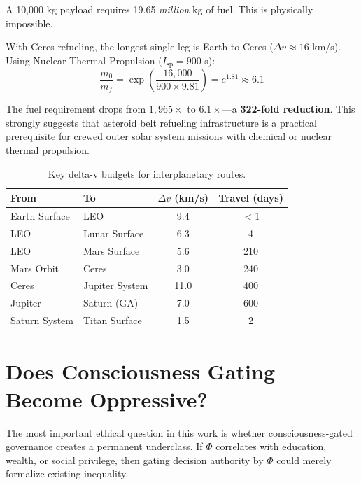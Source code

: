 \documentclass[12pt,a4paper]{article}
\begin{document}
A 10,000 kg payload requires 19.65 \emph{million} kg of fuel. This is physically impossible.

With Ceres refueling, the longest single leg is Earth-to-Ceres ($\Delta v \approx 16$ km/s). Using Nuclear Thermal Propulsion ($I_\text{sp} = 900$ s):
\begin{equation}
    \frac{m_0}{m_f} = \exp\left(\frac{16{,}000}{900 \times 9.81}\right) = e^{1.81} \approx 6.1
\end{equation}

The fuel requirement drops from $1{,}965\times$ to $6.1\times$---a \textbf{322-fold reduction}. This strongly suggests that asteroid belt refueling infrastructure is a practical prerequisite for crewed outer solar system missions with chemical or nuclear thermal propulsion.

\begin{table}[h]
\centering
\caption{Key delta-v budgets for interplanetary routes.}
\label{tab:deltav}
\begin{tabular}{@{}llcc@{}}
\toprule
\textbf{From} & \textbf{To} & \textbf{$\Delta v$ (km/s)} & \textbf{Travel (days)} \\
\midrule
Earth Surface & LEO              & 9.4  & $<$1 \\
LEO           & Lunar Surface    & 6.3  & 4 \\
LEO           & Mars Surface     & 5.6  & 210 \\
Mars Orbit    & Ceres            & 3.0  & 240 \\
Ceres         & Jupiter System   & 11.0 & 400 \\
Jupiter       & Saturn (GA)      & 7.0  & 600 \\
Saturn System & Titan Surface    & 1.5  & 2 \\
\bottomrule
\end{tabular}
\end{table}


\section{Does Consciousness Gating Become Oppressive?}
\label{sec:oppression}

The most important ethical question in this work is whether consciousness-gated governance creates a permanent underclass. If $\Phi$ correlates with education, wealth, or social privilege, then gating decision authority by $\Phi$ could merely formalize existing inequality.
\end{document}
